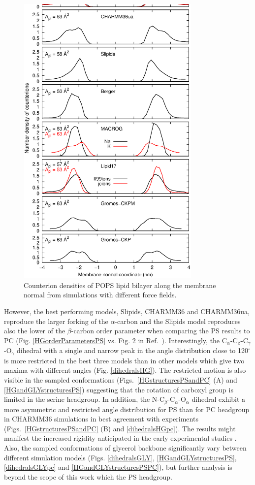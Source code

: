 \documentclass[aps,prl,superscriptaddress,twocolumn]{revtex4}
\begin{document}
\begin{figure}[!htb]
  \centering
  \includegraphics[width=9.0cm]{../Figs/NAdensPOPS.eps}
  \caption{\label{NAdensPOPS}
    Counterion densities of POPS lipid bilayer along the membrane normal from
    simulations with different force fields.
  }
\end{figure}



However, the best performing models,
Slipids, CHARMM36 and CHARMM36ua, reproduce the larger forking of the $\alpha$-carbon 
and the Slipids model reproduces also the lower of the $\beta$-carbon order parameter
when comparing the PS results to PC (Fig. \ref{HGorderParametersPS} vs. Fig. 2 in Ref.~).
Interestingly, the C$_\alpha$-C$_\beta$-C$_\gamma$-O$_\gamma$  dihedral with
a single and narrow peak in the angle distribution close to 120$^{\circ}$ is more restricted
in the best three models than in other models which give two maxima with different angles (Fig. \ref{dihedralsHG}).
The restricted motion is also
visible in the sampled conformations (Figs.~\ref{HGstructuresPSandPC} (A) and \ref{HGandGLYstructuresPS})
suggesting that the rotation of carboxyl group is limited in the serine headgroup.
In addition, the N-C$_\beta$-C$_\alpha$-O$_\alpha$ dihedral exhibit a more asymmetric
and restricted angle distribution for PS than for PC headgroup in
CHARMM36 simulations in best agreement with experiments
(Figs.~\ref{HGstructuresPSandPC} (B) and \ref{dihedralsHGpc}).
The results might manifest the increased rigidity anticipated in the early experimental studies \cite{browning80,buldt81}.
Also, the sampled conformations of glycerol backbone
significantly vary between different simulation models 
(Figs. \ref{dihedralsGLY}, \ref{HGandGLYstructuresPS}, \ref{dihedralsGLYpc} and \ref{HGandGLYstructuresPSPC}),
but further analysis is beyond the scope of this work which the PS headgroup.
\end{document}
